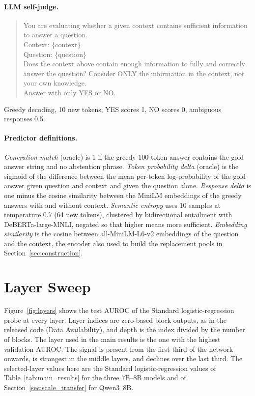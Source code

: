 \documentclass[acmsmall,screen,review]{acmart}
\begin{document}
\paragraph{LLM self-judge.}
\begin{quote}\small
You are evaluating whether a given context contains sufficient information to answer a question.\\
Context: \{context\}\\
Question: \{question\}\\
Does the context above contain enough information to fully and correctly answer the question? Consider ONLY the information in the context, not your own knowledge.\\
Answer with only YES or NO.
\end{quote}
Greedy decoding, 10 new tokens; YES scores 1, NO scores 0, ambiguous responses 0.5.

\paragraph{Predictor definitions.} \emph{Generation match} (oracle) is 1 if the greedy 100-token answer contains the gold answer string and no abstention phrase. \emph{Token probability delta} (oracle) is the sigmoid of the difference between the mean per-token log-probability of the gold answer given question and context and given the question alone. \emph{Response delta} is one minus the cosine similarity between the MiniLM embeddings of the greedy answers with and without context. \emph{Semantic entropy} uses 10 samples at temperature 0.7 (64 new tokens), clustered by bidirectional entailment with DeBERTa-large-MNLI, negated so that higher means more sufficient. \emph{Embedding similarity} is the cosine between all-MiniLM-L6-v2 embeddings of the question and the context, the encoder also used to build the replacement pools in Section~\ref{sec:construction}.

\section{Layer Sweep}
\label{sec:layers}
Figure~\ref{fig:layers} shows the test AUROC of the Standard logistic-regression probe at every layer. Layer indices are zero-based block outputs, as in the released code (Data Availability), and depth is the index divided by the number of blocks. The layer used in the main results is the one with the highest validation AUROC. The signal is present from the first third of the network onwards, is strongest in the middle layers, and declines over the last third. The selected-layer values here are the Standard logistic-regression values of Table~\ref{tab:main_results} for the three 7B--8B models and of Section~\ref{sec:scale_transfer} for Qwen3~8B.
\end{document}
